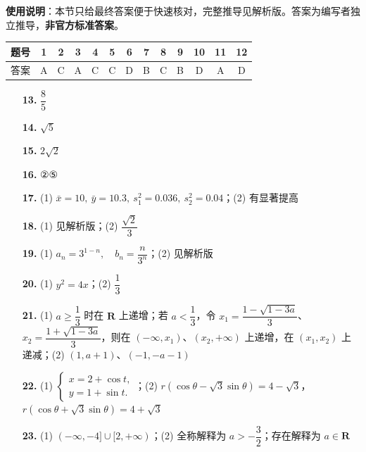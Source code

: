 
\begin{gknotice}
\textbf{使用说明}：本节只给最终答案便于快速核对，完整推导见解析版。答案为编写者独立推导，\textbf{非官方标准答案}。
\end{gknotice}

\begin{center}\begin{tabular}{ccccccccccccc}
\toprule
题号 & 1 & 2 & 3 & 4 & 5 & 6 & 7 & 8 & 9 & 10 & 11 & 12 \\
\midrule
答案 & A & C & A & C & C & D & B & C & B & D & A & D \\
\bottomrule
\end{tabular}\end{center}

\begin{itemize}[leftmargin=2.6em]
  \item[\textbf{13.}] $\dfrac85$
  \item[\textbf{14.}] $\sqrt5$
  \item[\textbf{15.}] $2\sqrt2$
  \item[\textbf{16.}] ②⑤
\end{itemize}

\begin{itemize}[leftmargin=2.6em]
  \item[\textbf{17.}] (1) $\bar x=10,\ \bar y=10.3,\ s_1^2=0.036,\ s_2^2=0.04$；(2) 有显著提高
  \item[\textbf{18.}] (1) 见解析版；(2) $\dfrac{\sqrt2}{3}$
  \item[\textbf{19.}] (1) $a_n=3^{1-n},\quad b_n=\dfrac{n}{3^n}$；(2) 见解析版
  \item[\textbf{20.}] (1) $y^2=4x$；(2) $\dfrac13$
  \item[\textbf{21.}] (1) $a\geqslant\dfrac13$ 时在 $\mathbf R$ 上递增；若 $a<\dfrac13$，令 $x_1=\dfrac{1-\sqrt{1-3a}}3$、$x_2=\dfrac{1+\sqrt{1-3a}}3$，则在 $(-\infty,x_1)$、$(x_2,+\infty)$ 上递增，在 $(x_1,x_2)$ 上递减；(2) $(1,a+1)$、$(-1,-a-1)$
\end{itemize}

\begin{itemize}[leftmargin=2.6em]
  \item[\textbf{22.}] (1) $\begin{cases}x=2+\cos t,\\y=1+\sin t.\end{cases}$；(2) $r(\cos\theta-\sqrt3\sin\theta)=4-\sqrt3$，$r(\cos\theta+\sqrt3\sin\theta)=4+\sqrt3$
  \item[\textbf{23.}] (1) $(-\infty,-4]\cup[2,+\infty)$；(2) 全称解释为 $a>-\dfrac32$；存在解释为 $a\in\mathbf R$
\end{itemize}

